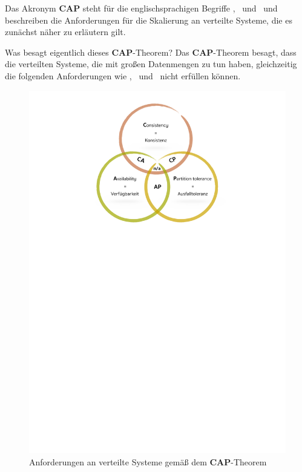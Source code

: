 Das Akronym \textbf{CAP} steht für die englischsprachigen Begriffe  \Cap, \cAp\ und \caP\ und beschreiben die Anforderungen für die Skalierung an verteilte Systeme, die es zunächst näher zu erläutern gilt.

Was besagt eigentlich dieses \textbf{CAP}-Theorem? Das \textbf{CAP}-Theorem besagt, dass die verteilten Systeme, die mit großen Datenmengen zu tun haben, gleichzeitig die folgenden Anforderungen wie \Cap, \cAp\ und \caP\ nicht erfüllen können.
%

\begin{figure}
\centering
\includegraphics[trim = 0mm 189mm 0mm 9mm, clip, width=1.0\textwidth]{resources/myPictureForCAP}
\caption[\textbf{CAP}-Theorem]{Anforderungen an verteilte Systeme gemäß dem \textbf{CAP}-Theorem}
\label{img:cap}
\end{figure}

